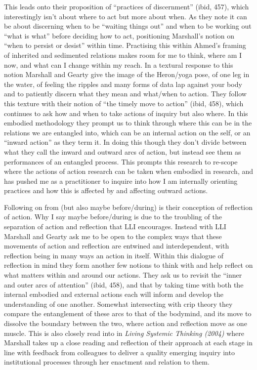 This leads onto their proposition of ``practices of discernment'' (ibid,
457), which interestingly isn't about where to act but more about when.
As they note it can be about discerning when to be ``waiting things
out'' and when to be working out ``what is what'' before deciding how to
act, positioning Marshall's notion on ``when to persist or desist''
within time. Practising this within Ahmed's framing of inherited and
sedimented relations makes room for me to think, where am I now, and
what can I change within my reach. In a textural response to this notion
Marshall and Gearty give the image of the Heron/yoga pose, of one leg in
the water, of feeling the ripples and many forms of data lap against
your body and to patiently discern what they mean and what/when to
action. They follow this texture with their notion of ``the timely move
to action'' (ibid, 458), which continues to ask how and when to take
actions of inquiry but also where. In this embodied methodology they
prompt us to think through where this can be in the relations we are
entangled into, which can be an internal action on the self, or an
``inward action'' as they term it. In doing this though they don't
divide between what they call the inward and outward arcs of action, but
instead see them as performances of an entangled process. This prompts
this research to re-scope where the actions of action research can be
taken when embodied in research, and has pushed me as a practitioner to
inquire into how I am internally orienting practices and how this is
affected by and affecting outward actions.

Following on from (but also maybe before/during) is their conception of
reflection of action. Why I say maybe before/during is due to the
troubling of the separation of action and reflection that LLI
encourages. Instead with LLI Marshall and Gearty ask me to be open to
the complex ways that these movements of action and reflection are
entwined and interdependent, with reflection being in many ways an
action in itself. Within this dialogue of reflection in mind they form
another few notions to think with and help reflect on what matters
within and around our actions. They ask us to revisit the ``inner and
outer arcs of attention'' (ibid, 458), and that by taking time with both
the internal embodied and external actions each will inform and develop
the understanding of one another. Somewhat intersecting with crip theory
they compare the entanglement of these arcs to that of the bodymind, and
its move to dissolve the boundary between the two, where action and
reflection move as one muscle. This is also closely read into in
\emph{Living Systemic Thinking (2004)} where Marshall takes up a close
reading and reflection of their approach at each stage in line with
feedback from colleagues to deliver a quality emerging inquiry into
institutional processes through her enactment and relation to them.

